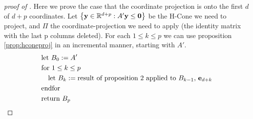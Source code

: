 \begin{proof}[proof of \Vproj]
  Here we prove the case that the coordinate projection is onto the first $d$ of $d+p$ coordinates.  Let $\left\{\mathbf{y}\in\mathbb{R}^{d+p}:A'\mathbf{y} \leq \mathbf{0}\right\}$ be the H-Cone we need to project, and $\Pi$ the coordinate-projection we need to apply (the identity matrix with the last p columns deleted).  For each $1 \leq k \leq p$ we can use proposition \ref{prop:hconeproj} in an incremental manner, starting with $A'$.
\begin{align*}
  &\text{let } B_0 := A'\\
  &\text{for } 1 \leq k \leq p \\
  &\quad \text{let } B_k := 
         \text{result of proposition 2 applied to $B_{k-1}$, $\mathbf{e}_{d+k}$} \\
  &\text{endfor} \\
  &\text{return } B_p
\end{align*}



\end{proof}
